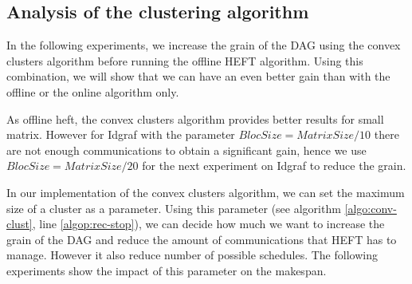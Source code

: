 \documentclass[10pt, conference, compsocconf,pdftex,dvipsnames]{IEEEtran}
\begin{document}
%            
%            
%


\subsection{Analysis of the clustering algorithm}
\label{sec:exp-exp-clust}

In the following experiments, we increase the grain of the DAG using the
convex clusters algorithm before running the offline HEFT algorithm. Using this
combination, we will show that we can have an even better gain than with the
offline or the online algorithm only.


As offline heft, the convex clusters algorithm provides better results for small
matrix. However for Idgraf with the parameter $BlocSize=MatrixSize/10$ there
are not enough communications to obtain a significant gain, hence we use
$BlocSize=MatrixSize/20$ for the next experiment on Idgraf to reduce the
grain. 

In our implementation of the convex clusters algorithm, we can set the maximum
size of a cluster as a parameter. Using this parameter (see algorithm
\ref{algo:conv-clust}, line \ref{algop:rec-stop}), we can decide how much we
want to increase the grain of the DAG and reduce the amount of communications
that HEFT has to manage.  However it also reduce number of possible schedules.
The following  experiments show the impact of this parameter on the makespan.
\end{document}
